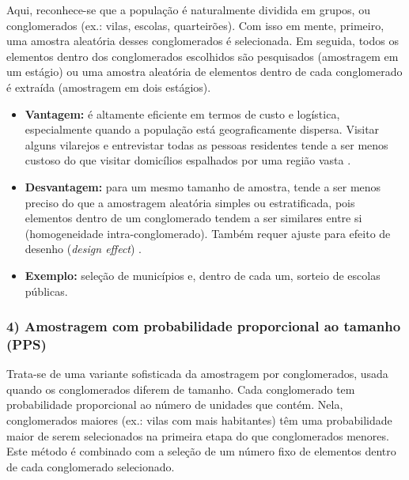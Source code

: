 \documentclass[12pt, a4paper, openany]{book}
\begin{document}
Aqui, reconhece-se que a popula\c{c}\~ao \'e naturalmente dividida em grupos, ou conglomerados (ex.: vilas, escolas, quarteir\~oes). Com isso em mente, primeiro, uma amostra aleat\'oria desses conglomerados \'e selecionada. Em seguida, todos os elementos dentro dos conglomerados escolhidos s\~ao pesquisados (amostragem em um est\'agio) ou uma amostra aleat\'oria de elementos dentro de cada conglomerado \'e extra\'ida (amostragem em dois est\'agios).

\begin{itemize}
\item \textbf{Vantagem:} \'e altamente eficiente em termos de custo e log\'istica, especialmente quando a popula\c{c}\~ao est\'a geograficamente dispersa. Visitar alguns vilarejos e entrevistar todas as pessoas residentes tende a ser menos custoso do que visitar domic\'ilios espalhados por uma regi\~ao vasta \citep{iarossi2006power,neuman2014social}.
\item \textbf{Desvantagem:} para um mesmo tamanho de amostra, tende a ser menos preciso do que a amostragem aleat\'oria simples ou estratificada, pois elementos dentro de um conglomerado tendem a ser similares entre si (homogeneidade intra-conglomerado). Tamb\'em requer ajuste para efeito de desenho (\textit{design effect}) \citep{gertler2018impact}.
\item \textbf{Exemplo:} sele\c{c}\~ao de munic\'ipios e, dentro de cada um, sorteio de escolas p\'ublicas.
\end{itemize}

\subsubsection*{4) Amostragem com probabilidade proporcional ao tamanho (PPS)}

Trata-se de uma variante sofisticada da amostragem por conglomerados, usada quando os conglomerados diferem de tamanho. Cada conglomerado tem probabilidade proporcional ao n\'umero de unidades que cont\'em. Nela, conglomerados maiores (ex.: vilas com mais habitantes) t\^em uma probabilidade maior de serem selecionados na primeira etapa do que conglomerados menores. Este m\'etodo \'e combinado com a sele\c{c}\~ao de um n\'umero fixo de elementos dentro de cada conglomerado selecionado.
\end{document}
